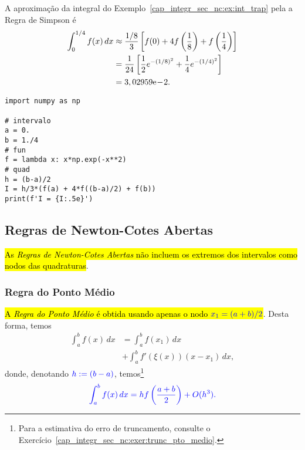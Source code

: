 \begin{ex}\label{cap_integr_sec_nc:ex:int_simp}
  A aproximação da integral do Exemplo~\ref{cap_integr_sec_nc:ex:int_trap} pela a Regra de Simpson é
  \begin{subequations}
    \begin{align}
      \int_0^{1/4} f(x)\,dx &\approx \frac{1/8}{3}\left[f(0) + 4f\left(\frac{1}{8}\right) + f\left(\frac{1}{4}\right)\right]\\
                            &= \frac{1}{24}\left[\frac{1}{2}e^{-(1/8)^2} + \frac{1}{4}e^{-(1/4)^2}\right]\\
                            &= 3,02959\mathrm{e}\!-\!2.
  \end{align}
\end{subequations}

\begin{lstlisting}
import numpy as np

# intervalo
a = 0.
b = 1./4
# fun
f = lambda x: x*np.exp(-x**2)
# quad
h = (b-a)/2
I = h/3*(f(a) + 4*f((b-a)/2) + f(b))
print(f'I = {I:.5e}')
\end{lstlisting}
\end{ex}

\subsection{Regras de Newton-Cotes Abertas}

\hl{As \emph{Regras de Newton-Cotes Abertas} não incluem os extremos dos intervalos como nodos das quadraturas}.

\subsubsection{Regra do Ponto Médio}

\hl{A \emph{Regra do Ponto Médio} é obtida usando apenas o nodo $\color{blue}x_1=(a+b)/2$}. Desta forma, temos
\begin{equation}
  \begin{aligned}
    \int_a^b f(x)\,dx &= \int_a^b f(x_1)\,dx\\
    &+ \int_a^b f'(\xi(x))(x-x_1)\,dx,
  \end{aligned}
\end{equation}
donde, denotando $\color{blue}h:=(b-a)$, temos\footnote{Para a estimativa do erro de truncamento, consulte o Exercício~\ref{cap_integr_sec_nc:exer:trunc_pto_medio}.}
\begin{equation}\color{blue}\int_a^b f(x)\,dx = hf\left(\frac{a+b}{2}\right) + O(h^3).
\end{equation}

